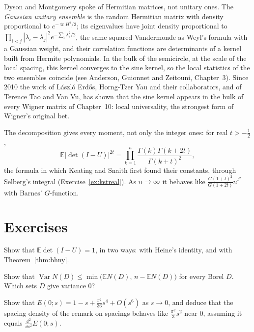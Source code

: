 \begin{remark}
Dyson and Montgomery spoke of Hermitian matrices, not unitary ones. The \emph{Gaussian unitary ensemble} is the random Hermitian matrix with density proportional to $e^{-\operatorname{tr}H^2/2}$; its eigenvalues have joint density proportional to
$\prod_{i<j}|\lambda_i-\lambda_j|^2e^{-\sum_i\lambda_i^2/2}$, the same squared Vandermonde as Weyl's formula with a Gaussian weight, and their correlation functions are determinants of a kernel built from Hermite polynomials. In the bulk of the
semicircle, at the scale of the local spacing, this kernel converges to the sine kernel, so the local statistics of the two ensembles coincide (see Anderson, Guionnet and Zeitouni, Chapter~3). Since 2010 the work of
L\'aszl\'o Erd\H os, Horng-Tzer Yau and their collaborators, and of Terence Tao and Van Vu, has shown that the sine kernel appears in the bulk of every Wigner matrix of Chapter~10: local universality, the strongest form of
Wigner's original bet.
\end{remark}

\begin{remark}
The decomposition gives every moment, not only the integer ones: for real $t>-\frac12$,
\[
\mathbb E|\det(I-U)|^{2t}=\prod_{k=1}^n\frac{\Gamma(k)\Gamma(k+2t)}{\Gamma(k+t)^2},
\]
the formula in which Keating and Snaith first found their constants, through Selberg's integral (Exercise~\ref{ex:kstreal}). As $n\to\infty$ it behaves like $\frac{G(1+t)^2}{G(1+2t)}n^{t^2}$ with Barnes' $G$-function.
\end{remark}

\section{Exercises}

\begin{exercise}[$\star$]\label{ex:meandet}
Show that $\mathbb E\det(I-U)=1$, in two ways: with Heine's identity, and with Theorem~\ref{thm:bhny}.
\end{exercise}

\begin{exercise}[$\star$]\label{ex:varbound}
Show that $\operatorname{Var}N(D)\le\min\bigl(\mathbb EN(D),\,n-\mathbb EN(D)\bigr)$ for every Borel $D$. Which sets $D$ give variance $0$?
\end{exercise}

\begin{exercise}[$\star\star$]\label{ex:smallgap}
Show that $E(0;s)=1-s+\frac{\pi^2}{36}s^4+O(s^6)$ as $s\to0$, and deduce that the spacing density of the remark on spacings behaves like $\frac{\pi^2}3s^2$ near $0$, assuming it equals $\frac{\dd^2}{\dd s^2}E(0;s)$.
\end{exercise}

